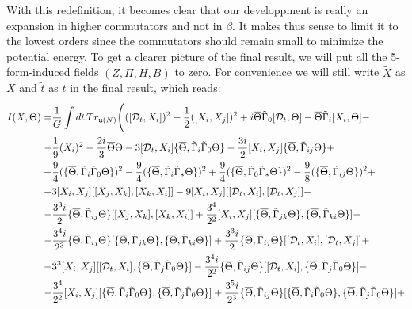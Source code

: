 \documentclass[a4paper,11pt]{article}
\def\G{{\Gamma}}
\begin{document}
With this redefinition, it becomes clear that our developpment is really an expansion in 
higher commutators and not in $\beta$. It makes thus sense to limit it to the lowest orders 
since the commutators should remain small to minimize the potential energy.
To get a clearer picture of the final result, we will put all the 5-form-induced fields $(Z,\Pi,H,B)$ to zero.
For convenience we will still write $\widetilde{X}$ as $X$ and $\tilde{t}$ as $t$ in 
the final result, which reads:
\begin{align*}
I(X,\Theta)=& \frac{1}{G}\int dt\, Tr_{\mathfrak{u}(N)} \Bigg(([{\cal D}_t,X_i])^2 + \frac{1}{2}([X_i,X_j])^2 +
i\overline{\Theta}\tilde{\G}_0 [{\cal D}_t,\Theta]-
\overline{\Theta}\tilde{\G}_i [X_i,\Theta] - \\
-&\frac{1}{9} (X_i)^2 - \frac{2i}{3}\overline{\Theta}\Theta - 
3 [{\cal D}_t,X_i] \{\overline{\Theta},\tilde{\G}_i \tilde{\G}_0 \Theta\} - 
\frac{3i}{2}[X_i,X_j]\{\overline{\Theta},\tilde{\G}_{ij} \Theta\} + \\
+&\frac{9}{4} (\{\overline{\Theta},\tilde{\G}_i \tilde{\G}_0 \Theta\})^2 - 
\frac{9}{4} (\{\overline{\Theta},\tilde{\G}_i \tilde{\G}_* \Theta\})^2 + 
\frac{9}{4} (\{\overline{\Theta},\tilde{\G}_0 \tilde{\G}_* \Theta\})^2 - 
\frac{9}{8} (\{\overline{\Theta},\tilde{\G}_{ij} \Theta\})^2 + \\
+&3 [X_i,X_j][[X_j,X_k],[X_k,X_i]] - 9 [X_i,X_j][[{\cal D}_t,X_i],[{\cal D}_t,X_j]]- \\
-& \frac{3^3i}{2} \{\overline{\Theta},\tilde{\G}_{ij} \Theta\} [[X_j,X_k],[X_k,X_i]] + 
\frac{3^4}{2^2} [X_i,X_j]
[\{\overline{\Theta},\tilde{\G}_{jk} \Theta\},\{\overline{\Theta},\tilde{\G}_{ki} \Theta\}] - \\
-& \frac{3^4i}{2^3}\{\overline{\Theta},\tilde{\G}_{ij} \Theta\}
[\{\overline{\Theta},\tilde{\G}_{jk} \Theta\},\{\overline{\Theta},\tilde{\G}_{ki} \Theta\}]+ 
\frac{3^3i}{2}\{\overline{\Theta},\tilde{\G}_{ij} \Theta\}[[{\cal D}_t,X_i],[{\cal D}_t,X_j]] + \\
+& 3^3 [X_i,X_j][[{\cal D}_t,X_i],\{\overline{\Theta},\tilde{\G}_j \tilde{\G}_0 \Theta\}] -
\frac{3^4i}{2^2}\{\overline{\Theta},\tilde{\G}_{ij} \Theta\}
[[{\cal D}_t,X_i],\{\overline{\Theta},\tilde{\G}_j \tilde{\G}_0 \Theta\}] - \\
-& \frac{3^4}{2^2}[X_i,X_j]
[\{\overline{\Theta},\tilde{\G}_i \tilde{\G}_0 \Theta\},\{\overline{\Theta},\tilde{\G}_j \tilde{\G}_0 \Theta\}] +
\frac{3^5i}{2^3}\{\overline{\Theta},\tilde{\G}_{ij} \Theta\}
[\{\overline{\Theta},\tilde{\G}_i \tilde{\G}_0 \Theta\},\{\overline{\Theta},\tilde{\G}_j \tilde{\G}_0 \Theta\}]+\\

\end{align*}
\end{document}
